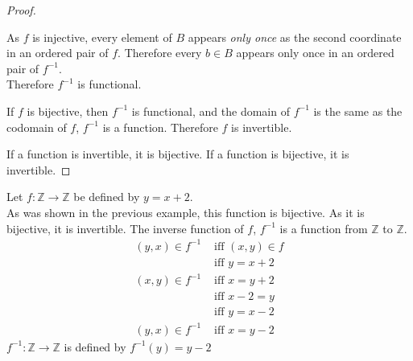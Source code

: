 \documentclass[../notes.tex]{subfiles}
\begin{document}
\begin{theorem}
\begin{proof}
\begin{indentparagraph}
\begin{subproof}[Subproof]
								As $f$ is injective, every element of $B$ appears \emph{only once} as the second coordinate in an ordered pair of $f$. Therefore every $b \in B$ appears only once in an ordered pair of $f^{-1}$.\\
								Therefore $f^{-1}$ is functional.

								If $f$ is bijective, then $f^{-1}$ is functional, and the domain of $f^{-1}$ is the same as the codomain of $f$, $f^{-1}$ is a function. Therefore $f$ is invertible.
							\end{subproof}
						\end{indentparagraph}
						If a function is invertible, it is bijective. If a function is bijective, it is invertible.
					\end{proof}
				\end{theorem}
				\begin{example}
					Let $f: \mathbb{Z} \rightarrow \mathbb{Z}$ be defined by $y = x + 2$.\\
					As was shown in the previous example, this function is bijective. As it is bijective, it is invertible. The inverse function of $f$, $f^{-1}$ is a function from $\mathbb{Z}$ to $\mathbb{Z}$.
					\begin{align*}
						(y, x) \in f^{-1} &\text{ iff } (x, y) \in f\\
						& \text{ iff } y = x + 2\\
						(x, y) \in f^{-1} &\text{ iff } x = y + 2 \tag*{(swap variables)}\\
						&\text{ iff } x - 2 = y \tag*{(solve for $y$)}\\
						&\text{ iff } y = x - 2\\
						(y, x) \in f^{-1} & \text{ iff } x = y - 2 \tag*{(swap variables back)}
					\end{align*}
					$f^{-1}: \mathbb{Z} \rightarrow \mathbb{Z}$ is defined by $f^{-1}(y) = y - 2$
				\end{example}
\end{document}
